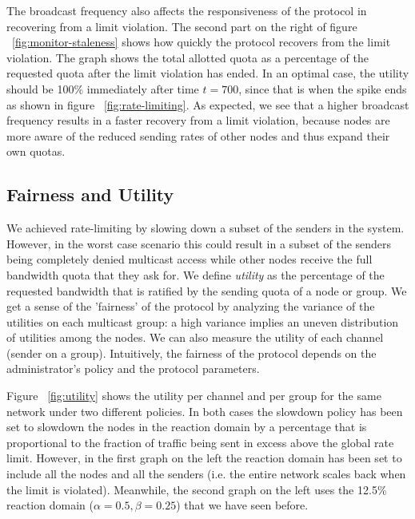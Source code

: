 The broadcast frequency also affects the responsiveness of the protocol in recovering from a limit violation. The second part on the right of figure ~\ref{fig:monitor-staleness} shows how quickly the protocol recovers from the limit violation. The graph shows the total allotted quota as a percentage of the requested quota after the limit violation has ended. In an optimal case, the utility should be 100\% immediately after time $t=700$, since that is when the spike ends as shown in figure ~\ref{fig:rate-limiting}. As expected, we see that a higher broadcast frequency results in a faster recovery from a limit violation, because nodes are more aware of the reduced sending rates of other nodes and thus expand their own quotas.

\subsection{Fairness and Utility}

We achieved rate-limiting by slowing down a subset of the senders in the system. However, in the worst case scenario this could result in a subset of the senders being completely denied multicast access while other nodes receive the full bandwidth quota that they ask for. We define \textit{utility} as the percentage of the requested bandwidth that is ratified by the sending quota of a node or group. We get a sense of the 'fairness' of the protocol by analyzing the variance of the utilities on each multicast group: a high variance implies an uneven distribution of utilities among the nodes. We can also measure the utility of each channel (sender on a group). Intuitively, the fairness of the protocol depends on the administrator's policy and the protocol parameters.

Figure ~\ref{fig:utility} shows the utility per channel and per group for the same network under two different policies. In both cases the slowdown policy has been set to slowdown the nodes in the reaction domain by a percentage that is proportional to the fraction of traffic being sent in excess above the global rate limit. However, in the first graph on the left the reaction domain has been set to include all the nodes and all the senders (i.e. the entire network scales back when the limit is violated). Meanwhile, the second graph on the left uses the 12.5\% reaction domain ($\alpha=0.5, \beta=0.25$) that we have seen before.


